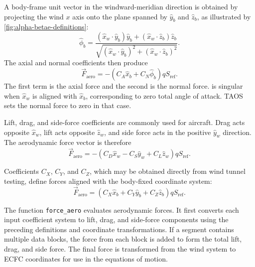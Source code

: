 A body-frame unit vector in the windward-meridian direction is obtained by
projecting the wind $x$ axis onto the plane spanned by $\hat y_b$ and $\hat z_b$,
as illustrated by \cref{fig:alpha-betae-definitions}:
\begin{equation}
  \hat\phi_b
  =\frac{
      (\hat x_w\mathbin{\cdot}\hat y_b)\hat y_b
      +(\hat x_w\mathbin{\cdot}\hat z_b)\hat z_b}
    {\sqrt{
      (\hat x_w\mathbin{\cdot}\hat y_b)^2
      +(\hat x_w\mathbin{\cdot}\hat z_b)^2}}.
  \label{eq:windward-meridian-unit-vector}
\end{equation}
The axial and normal coefficients then produce
\begin{equation}
  \vec F_{\mathrm{aero}}
  =-\left(C_A\hat x_b+C_N\hat\phi_b\right)qS_{\mathrm{ref}}.
  \label{eq:aero-force-axial-normal}
\end{equation}
The first term is the axial force and the second is the normal force.
 is singular when $\hat x_w$ is aligned
with $\hat x_b$, corresponding to zero total angle of attack. TAOS sets the normal
force to zero in that case.


Lift, drag, and side-force coefficients are commonly used for aircraft. Drag acts
opposite $\hat x_w$, lift acts opposite $\hat z_w$, and side force acts in the
positive $\hat y_w$ direction. The aerodynamic force vector is therefore
\begin{equation}
  \vec F_{\mathrm{aero}}
  =-\left(C_D\hat x_w-C_S\hat y_w+C_L\hat z_w\right)
    qS_{\mathrm{ref}}.
  \label{eq:aero-force-lift-drag-side}
\end{equation}


Coefficients $C_X$, $C_Y$, and $C_Z$, which may be obtained directly from wind
tunnel testing, define forces aligned with the body-fixed coordinate system:
\begin{equation}
  \vec F_{\mathrm{aero}}
  =\left(C_X\hat x_b+C_Y\hat y_b+C_Z\hat z_b\right)
    qS_{\mathrm{ref}}.
  \label{eq:aero-force-body-axes}
\end{equation}


The function \texttt{force\_aero} evaluates aerodynamic forces. It first converts
each input coefficient system to lift, drag, and side-force components using the
preceding definitions and coordinate transformations. If a segment contains
multiple  data blocks, the force from each block is added to
form the total lift, drag, and side force. The final force is transformed from the wind
system to ECFC coordinates for use in the equations of motion.

